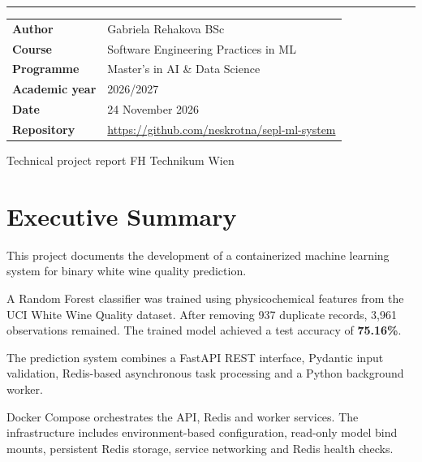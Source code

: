 \documentclass[11pt,a4paper]{article}
\renewcommand{\arraystretch}{1.16}
\begin{document}
\begin{titlepage}
\vspace{12mm}

\rule{\linewidth}{.5pt}\par

\vspace{6mm}

\renewcommand{\arraystretch}{1.4}

\begin{tabularx}{\linewidth}{@{}p{35mm}X@{}}
    \textbf{Author} & Gabriela Rehakova BSc\\
    \textbf{Course} & Software Engineering Practices in ML\\
    \textbf{Programme} & Master's in AI \& Data Science\\
    \textbf{Academic year} & 2026/2027\\
    \textbf{Date} & 24 November 2026\\
    \textbf{Repository} &
    \url{https://github.com/neskrotna/sepl-ml-system}
\end{tabularx}

\vfill

{\small\color{muted}
Technical project report
\hfill FH Technikum Wien}\par

\end{titlepage}



\section*{Executive Summary}

This project documents the development of a containerized
machine learning system for binary white wine quality
prediction.

A Random Forest classifier was trained using physicochemical
features from the UCI White Wine Quality dataset. After
removing 937 duplicate records, 3,961 observations remained.
The trained model achieved a test accuracy of
\textbf{75.16\%}.

The prediction system combines a FastAPI REST interface,
Pydantic input validation, Redis-based asynchronous task
processing and a Python background worker.

Docker Compose orchestrates the API, Redis and worker
services. The infrastructure includes environment-based
configuration, read-only model bind mounts, persistent
Redis storage, service networking and Redis health checks.
\end{document}
